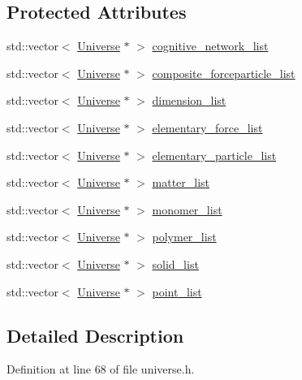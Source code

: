 \subsection*{Protected Attributes}
\begin{DoxyCompactItemize}
\item 
std\+::vector$<$ \hyperlink{class_universe}{Universe} $\ast$ $>$ \hyperlink{class_universe_a7a0e9796ff0d650a8b1fbde5fa5b761f}{cognitive\+\_\+network\+\_\+list}
\item 
std\+::vector$<$ \hyperlink{class_universe}{Universe} $\ast$ $>$ \hyperlink{class_universe_ae9795d06e406c4322637825aa545aa2f}{composite\+\_\+forceparticle\+\_\+list}
\item 
std\+::vector$<$ \hyperlink{class_universe}{Universe} $\ast$ $>$ \hyperlink{class_universe_a159461f7098c3a30274f54c8acff6eac}{dimension\+\_\+list}
\item 
std\+::vector$<$ \hyperlink{class_universe}{Universe} $\ast$ $>$ \hyperlink{class_universe_a015b19f6d5ad84ebaa9e3e7c8352389c}{elementary\+\_\+force\+\_\+list}
\item 
std\+::vector$<$ \hyperlink{class_universe}{Universe} $\ast$ $>$ \hyperlink{class_universe_aeb2e63cf49f0b5595e6c15109863bd3b}{elementary\+\_\+particle\+\_\+list}
\item 
std\+::vector$<$ \hyperlink{class_universe}{Universe} $\ast$ $>$ \hyperlink{class_universe_a409650bc0425fc22c7713487a2a6dd8e}{matter\+\_\+list}
\item 
std\+::vector$<$ \hyperlink{class_universe}{Universe} $\ast$ $>$ \hyperlink{class_universe_a3d55ba29f95a9793b69c01f7942eca9f}{monomer\+\_\+list}
\item 
std\+::vector$<$ \hyperlink{class_universe}{Universe} $\ast$ $>$ \hyperlink{class_universe_a4d898757f2d67ca5ab5d504388d6199a}{polymer\+\_\+list}
\item 
std\+::vector$<$ \hyperlink{class_universe}{Universe} $\ast$ $>$ \hyperlink{class_universe_a747f9d3cf0b2caada4461cb7b12ea17b}{solid\+\_\+list}
\item 
std\+::vector$<$ \hyperlink{class_universe}{Universe} $\ast$ $>$ \hyperlink{class_universe_a9dc8abd2f8f84318722184f38e1b8cc7}{point\+\_\+list}
\end{DoxyCompactItemize}


\subsection{Detailed Description}


Definition at line 68 of file universe.\+h.



